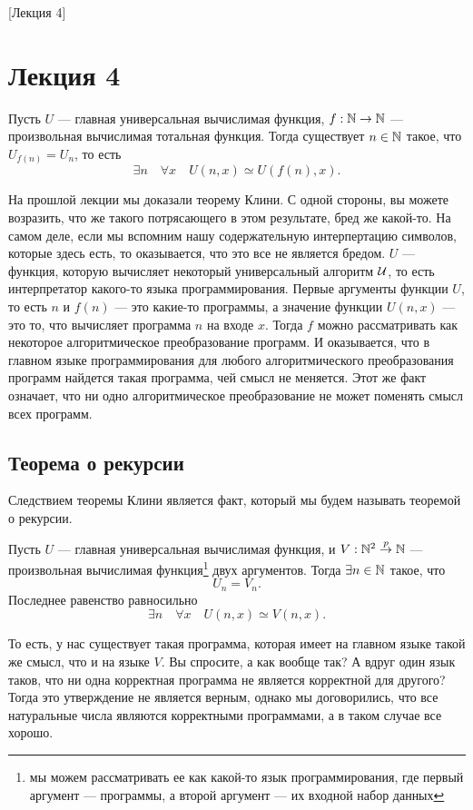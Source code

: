 [Лекция 4]
\newpage

\section{Лекция 4}

\begin{theorem}
    Пусть $U$ --- главная универсальная вычислимая функция, $f: \mathbb{N} \to \mathbb{N}$ --- произвольная вычислимая тотальная функция.
    Тогда существует $n \in \mathbb{N}$ такое, что $U_{f\left(n\right)} = U_{n}$, то есть
    $$
        \exists n \quad \forall x \quad U\left(n, x\right) \simeq U\left(f\left(n\right), x\right).
    $$
\end{theorem}

На прошлой лекции мы доказали теорему Клини.
С одной стороны, вы можете возразить, что же такого потрясающего в этом результате, бред же какой-то.
На самом деле, если мы вспомним нашу содержательную интерпертацию символов, которые здесь есть, то оказывается, что это все не является бредом.
$U$ --- функция, которую вычисляет некоторый универсальный алгоритм $\mathcal{U}$, то есть интерпретатор какого-то языка программирования.
Первые аргументы функции $U$, то есть $n$ и $f(n)$ --- это какие-то программы, а значение функции $U\left(n, x\right)$ --- это то, что вычисляет программа $n$ на входе $x$.
Тогда $f$ можно рассматривать как некоторое алгоритмическое преобразование программ.
И оказывается, что в главном языке программирования для любого алгоритмического преобразования программ найдется такая программа, чей смысл не меняется.
Этот же факт означает, что ни одно алгоритмическое преобразование не может поменять смысл всех программ.

\subsection{Теорема о рекурсии}

Следствием теоремы Клини является факт, который мы будем называть теоремой о рекурсии.
\begin{corollary}
    Пусть $U$ --- главная универсальная вычислимая функция, и $V: \mathbb{N}^{2} \overset{p}{\to} \mathbb{N}$ --- произвольная вычислимая функция\footnote{мы можем рассматривать ее как какой-то язык программирования, где первый аргумент --- программы, а второй аргумент --- их входной набор данных} двух аргументов.
    Тогда $\exists n \in \mathbb{N}$ такое, что
    $$
        U_{n} = V_{n}.
    $$
    Последнее равенство равносильно
    $$
        \exists n \quad \forall x \quad U\left(n, x\right) \simeq V\left(n, x\right).
    $$
\end{corollary}
То есть, у нас существует такая программа, которая имеет на главном языке такой же смысл, что и на языке $V$.
Вы спросите, а как вообще так?
А вдруг один язык таков, что ни одна корректная программа не является корректной для другого?
Тогда это утверждение не является верным, однако мы договорились, что все натуральные числа являются корректными программами, а в таком случае все хорошо.

